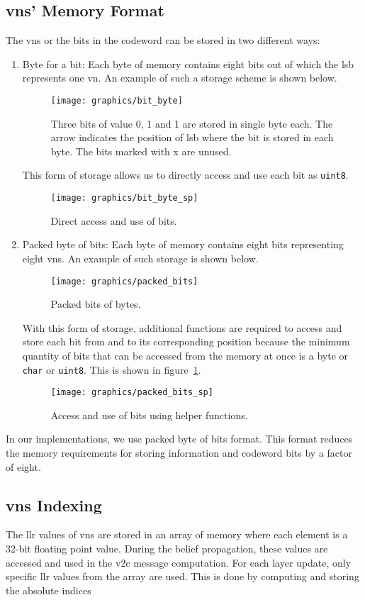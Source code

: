 \subsection{\aclp{vn}' Memory Format}
The \acp{vn} or the bits in the codeword can be stored in two different ways:
\begin{enumerate}
  \item Byte for a bit: Each byte of memory contains eight bits out of which the \ac{lsb} represents one \ac{vn}. An example of such a storage scheme is shown below.
  \begin{figure}[htbp]
    \centering
    \texttt{[image: graphics/bit\_byte]}
    \caption{Three bits of value 0, 1 and 1 are stored in single byte each. The arrow indicates the position of \ac{lsb} where the bit is stored in each byte. The bits marked with x are unused.}
  \end{figure}
  This form of storage allows us to directly access and use each bit as \texttt{uint8}.
  \begin{figure}[htbp]
    \centering
    \texttt{[image: graphics/bit\_byte\_sp]}
    \caption{Direct access and use of bits.}
  \end{figure}
  \item Packed byte of bits: Each byte of memory contains eight bits representing eight \acp{vn}. An example of such storage is shown below.
  \begin{figure}[htbp]
    \centering
    \texttt{[image: graphics/packed\_bits]}
    \caption{Packed bits of bytes.}
  \end{figure}
  With this form of storage, additional functions are required to access and store each bit from and to its corresponding position because the minimum quantity of bits that can be accessed from the memory at once is a byte or \texttt{char} or \texttt{uint8}. This is shown in figure~\ref{fig:packed_spb}.
  \begin{figure}[htbp]
    \centering
    \texttt{[image: graphics/packed\_bits\_sp]}
    \caption{Access and use of bits using helper functions.}
    \label{fig:packed_spb}
  \end{figure}
\end{enumerate}
In our implementations, we use packed byte of bits format. This format reduces the memory requirements for storing information and codeword bits by a factor of eight.

\subsection{\aclp{vn} Indexing}
The \ac{llr} values of \acp{vn} are stored in an array of memory where each element is a 32-bit floating point value. During the belief propagation, these values are accessed and used in the \ac{v2c} message computation. For each layer update, only specific \ac{llr} values from the array are used. This is done by computing and storing the absolute indices 